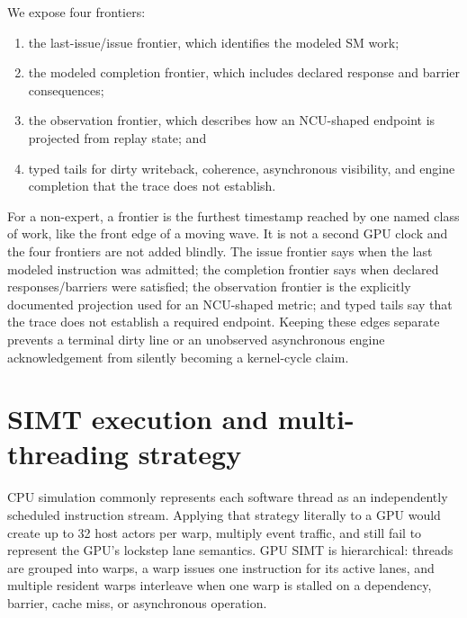 \documentclass[10pt,letterpaper]{article}
\begin{document}
We expose four frontiers:
\begin{enumerate}[leftmargin=1.35em,itemsep=2pt]
  \item the last-issue/issue frontier, which identifies the modeled SM work;
  \item the modeled completion frontier, which includes declared response and
    barrier consequences;
  \item the observation frontier, which describes how an NCU-shaped endpoint
    is projected from replay state; and
  \item typed tails for dirty writeback, coherence, asynchronous visibility,
    and engine completion that the trace does not establish.
\end{enumerate}

For a non-expert, a frontier is the furthest timestamp reached by one named
class of work, like the front edge of a moving wave.  It is not a second GPU
clock and the four frontiers are not added blindly.  The issue frontier says
when the last modeled instruction was admitted; the completion frontier says
when declared responses/barriers were satisfied; the observation frontier is
the explicitly documented projection used for an NCU-shaped metric; and typed
tails say that the trace does not establish a required endpoint.  Keeping these
edges separate prevents a terminal dirty line or an unobserved asynchronous
engine acknowledgement from silently becoming a kernel-cycle claim.

\section{SIMT execution and multi-threading strategy}
\label{sec:simt}

CPU simulation commonly represents each software thread as an independently
scheduled instruction stream.  Applying that strategy literally to a GPU would
create up to 32 host actors per warp, multiply event traffic, and still fail to
represent the GPU's lockstep lane semantics.  GPU SIMT is hierarchical:
threads are grouped into warps, a warp issues one instruction for its active
lanes, and multiple resident warps interleave when one warp is stalled on a
dependency, barrier, cache miss, or asynchronous operation.
\end{document}
